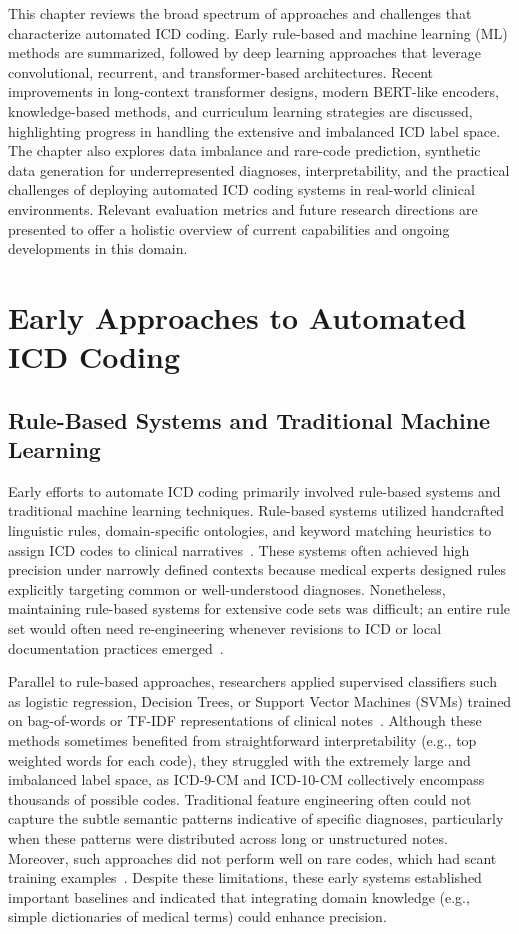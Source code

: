 This chapter reviews the broad spectrum of approaches and challenges that characterize automated ICD coding. Early rule-based and machine learning (ML) methods are summarized, followed by deep learning approaches that leverage convolutional, recurrent, and transformer-based architectures. Recent improvements in long-context transformer designs, modern BERT-like encoders, knowledge-based methods, and curriculum learning strategies are discussed, highlighting progress in handling the extensive and imbalanced ICD label space. The chapter also explores data imbalance and rare-code prediction, synthetic data generation for underrepresented diagnoses, interpretability, and the practical challenges of deploying automated ICD coding systems in real-world clinical environments. Relevant evaluation metrics and future research directions are presented to offer a holistic overview of current capabilities and ongoing developments in this domain.

\section{Early Approaches to Automated ICD Coding}

\subsection{Rule-Based Systems and Traditional Machine Learning}

Early efforts to automate ICD coding primarily involved rule-based systems and traditional machine learning techniques. Rule-based systems utilized handcrafted linguistic rules, domain-specific ontologies, and keyword matching heuristics to assign ICD codes to clinical narratives~\citep{farkas2008automatic, scheurwegs2017data}. These systems often achieved high precision under narrowly defined contexts because medical experts designed rules explicitly targeting common or well-understood diagnoses. Nonetheless, maintaining rule-based systems for extensive code sets was difficult; an entire rule set would often need re-engineering whenever revisions to ICD or local documentation practices emerged~\citep{scheurwegs2017data}.

Parallel to rule-based approaches, researchers applied supervised classifiers such as logistic regression, Decision Trees, or Support Vector Machines (SVMs) trained on bag-of-words or TF-IDF representations of clinical notes~\citep{perotte2014diagnosis}. Although these methods sometimes benefited from straightforward interpretability (e.g., top weighted words for each code), they struggled with the extremely large and imbalanced label space, as ICD-9-CM and ICD-10-CM collectively encompass thousands of possible codes. Traditional feature engineering often could not capture the subtle semantic patterns indicative of specific diagnoses, particularly when these patterns were distributed across long or unstructured notes. Moreover, such approaches did not perform well on rare codes, which had scant training examples~\citep{duque2021knowledge}. Despite these limitations, these early systems established important baselines and indicated that integrating domain knowledge (e.g., simple dictionaries of medical terms) could enhance precision.

